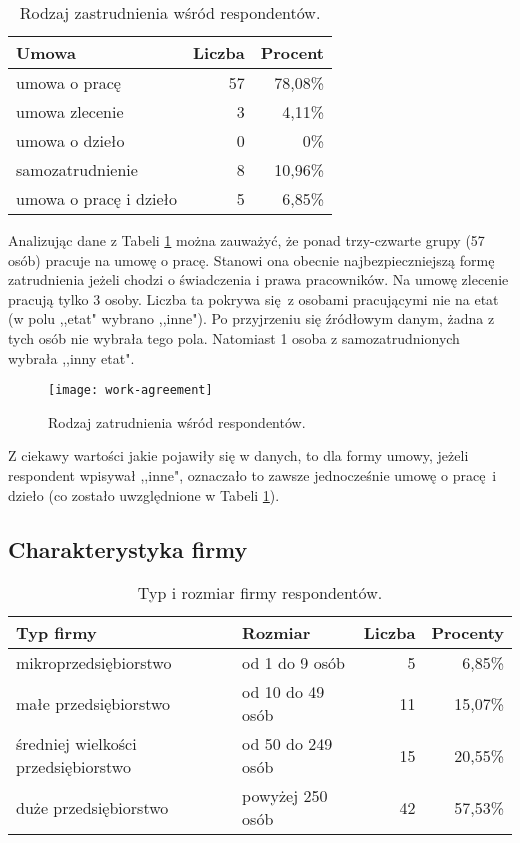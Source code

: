 \begin{table}[h!]
\begin{center}
\begin{tabular}{l r r}
Umowa & Liczba & Procent \\ \hline
umowa o pracę & 57 & 78,08\% \\
umowa zlecenie & 3 & 4,11\% \\
umowa o dzieło & 0 & 0\% \\
samozatrudnienie & 8 & 10,96\% \\
umowa o pracę i dzieło & 5 & 6,85\% \\
\end{tabular}
\end{center}
\caption{Rodzaj zastrudnienia wśród respondentów.}
\label{tab:work-time-stats}
\end{table}

Analizując dane z Tabeli \ref{tab:work-time-stats} można zauważyć, że ponad trzy-czwarte grupy (57 osób) pracuje na umowę o pracę. Stanowi ona obecnie najbezpieczniejszą formę zatrudnienia jeżeli chodzi o świadczenia i prawa pracowników. Na umowę zlecenie pracują tylko 3 osoby. Liczba ta pokrywa się z osobami pracującymi nie na etat (w polu ,,etat" wybrano ,,inne"). Po przyjrzeniu się źródłowym danym, żadna z tych osób nie wybrała tego pola. Natomiast 1 osoba z
samozatrudnionych wybrała ,,inny etat". 

\begin{figure}[htb]
\begin{center}
\texttt{[image: work-agreement]}
\end{center}
\caption{Rodzaj zatrudnienia wśród respondentów.}
\label{fig:work-agreement}
\end{figure}

Z ciekawy wartości jakie pojawiły się w danych, to dla formy umowy, jeżeli respondent wpisywał ,,inne", oznaczało to zawsze jednocześnie umowę o pracę i dzieło (co zostało uwzględnione w Tabeli \ref{tab:work-time-stats}).

\subsection{Charakterystyka firmy}

\begin{table}[h!]
\begin{center}
\begin{tabular}{l l r r}
Typ firmy & Rozmiar & Liczba & Procenty \\ \hline
mikroprzedsiębiorstwo & od 1 do 9 osób & 5 & 6,85\% \\
małe przedsiębiorstwo & od 10 do 49 osób & 11 & 15,07\% \\
średniej wielkości przedsiębiorstwo & od 50 do 249 osób & 15 & 20,55\% \\
duże przedsiębiorstwo & powyżej 250 osób & 42 & 57,53\% \\
\end{tabular}
\end{center}
\caption{Typ i rozmiar firmy respondentów.}
\label{tab:company-size}
\end{table}


